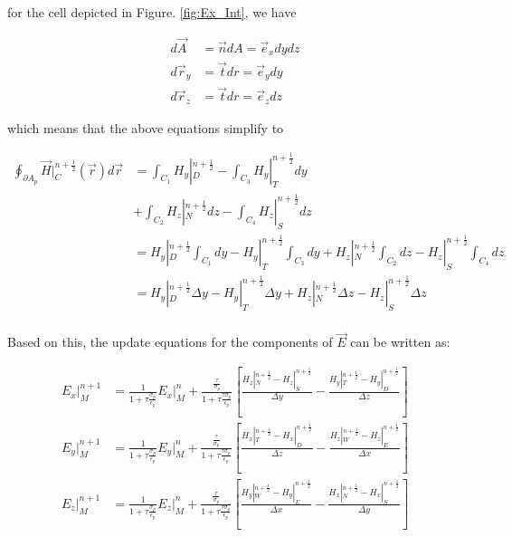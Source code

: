     for the cell depicted in Figure. \ref{fig:Ex_Int}, we have

    \begin{align}
        d\vec{A} &= \vec{n}dA = \vec{e}_xdydz \\
        d\vec{r}_y &= \vec{t}dr = \vec{e}_ydy \\
        d\vec{r}_z &= \vec{t}dr = \vec{e}_zdz
    \end{align}

    which means that the above equations simplify to

    \begin{align}
        \oint_{\partial A_p} \vec{H}|^{n+\frac{1}{2}}_{C}(\vec{r})d\vec{r} &= \int_{C_1}H_y|_D^{n+\frac{1}{2}} - \int_{C_3} H_y|_T^{n+\frac{1}{2}}dy \\
        &+\int_{C_2}H_z|_{N}^{n+\frac{1}{2}}dz - \int_{C_4}H_z|_{S}^{n+\frac{1}{2}}dz \\
        &= H_y|_D^{n+\frac{1}{2}}\int_{C_1}dy - H_y|_T^{n+\frac{1}{2}} \int_{C_3} dy +H_z|_{N}^{n+\frac{1}{2}}\int_{C_2}dz - H_z|_{S}^{n+\frac{1}{2}}\int_{C_4}dz\\
        &= H_y|_D^{n+\frac{1}{2}}\Delta y - H_y|_T^{n+\frac{1}{2}} \Delta y +H_z|_{N}^{n+\frac{1}{2}}\Delta z - H_z|_{S}^{n+\frac{1}{2}}\Delta z\\
    \end{align}

    Based on this, the update equations for the components of $\vec{E}$ can be written as:

    \begin{align}
        E_x|_M^{n+1} &= \frac{1}{1+\tau\frac{\sigma_p}{\epsilon_p}}E_x|_M^n
            + \frac{\frac{\tau}{\sigma_p}}{1+\tau\frac{\tau\sigma_p}{\epsilon_p}}\left[\frac{H_z|_N^{n+\frac{1}{2}}-H_z|_S^{n+\frac{1}{2}}}{\Delta y}
            - \frac{H_y|_T^{n+\frac{1}{2}} - H_y|_D^{n+\frac{1}{2}}}{\Delta z}\right]\\
        E_y|_M^{n+1} &= \frac{1}{1+\tau\frac{\sigma_p}{\epsilon_p}}E_y|_M^n
            + \frac{\frac{\tau}{\sigma_p}}{1+\tau\frac{\tau\sigma_p}{\epsilon_p}}\left[\frac{H_x|_T^{n+\frac{1}{2}}-H_x|_D^{n+\frac{1}{2}}}{\Delta z}
            - \frac{H_z|_W^{n+\frac{1}{2}} - H_z|_E^{n+\frac{1}{2}}}{\Delta x}\right]\\
        E_z|_M^{n+1} &= \frac{1}{1+\tau\frac{\sigma_p}{\epsilon_p}}E_z|_M^n
            + \frac{\frac{\tau}{\sigma_p}}{1+\tau\frac{\tau\sigma_p}{\epsilon_p}}\left[\frac{H_y|_W^{n+\frac{1}{2}}-H_y|_E^{n+\frac{1}{2}}}{\Delta x}
            - \frac{H_x|_N^{n+\frac{1}{2}} - H_x|_S^{n+\frac{1}{2}}}{\Delta y}\right]
    \end{align}

